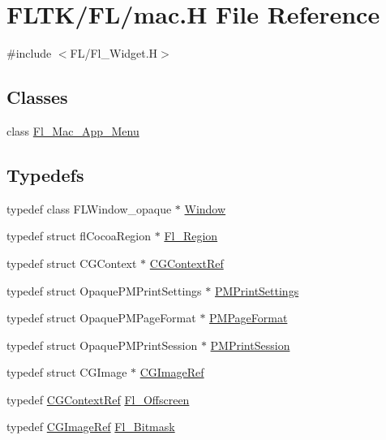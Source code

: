 \hypertarget{mac_8_h}{}\section{F\+L\+T\+K/\+F\+L/mac.H File Reference}
\label{mac_8_h}
{\ttfamily \#include $<$F\+L/\+Fl\+\_\+\+Widget.\+H$>$}\newline
\subsection*{Classes}
\begin{DoxyCompactItemize}
\item 
class \hyperlink{class_fl___mac___app___menu}{Fl\+\_\+\+Mac\+\_\+\+App\+\_\+\+Menu}
\end{DoxyCompactItemize}
\subsection*{Typedefs}
\begin{DoxyCompactItemize}
\item 
typedef class F\+L\+Window\+\_\+opaque $\ast$ \hyperlink{mac_8_h_a213656d363e884b651cc92f58e863fc6}{Window}
\item 
typedef struct fl\+Cocoa\+Region $\ast$ \hyperlink{mac_8_h_ac80c9f95cc93c989c5a953a749f45cb6}{Fl\+\_\+\+Region}
\item 
typedef struct C\+G\+Context $\ast$ \hyperlink{mac_8_h_aa24159a5753580ec784c2fd390213c7f}{C\+G\+Context\+Ref}
\item 
typedef struct Opaque\+P\+M\+Print\+Settings $\ast$ \hyperlink{mac_8_h_ae884d71f2d3fc33a29e1720245fb9de5}{P\+M\+Print\+Settings}
\item 
typedef struct Opaque\+P\+M\+Page\+Format $\ast$ \hyperlink{mac_8_h_afda4f1155b3e6fd1f500313ed4376138}{P\+M\+Page\+Format}
\item 
typedef struct Opaque\+P\+M\+Print\+Session $\ast$ \hyperlink{mac_8_h_ac2b872188288fc60768520efc0ddf821}{P\+M\+Print\+Session}
\item 
typedef struct C\+G\+Image $\ast$ \hyperlink{mac_8_h_a75461eac74c23c49c936eb8811388b88}{C\+G\+Image\+Ref}
\item 
typedef \hyperlink{mac_8_h_aa24159a5753580ec784c2fd390213c7f}{C\+G\+Context\+Ref} \hyperlink{mac_8_h_ad24d9679e17ea5ffa910ed355d4df340}{Fl\+\_\+\+Offscreen}
\item 
typedef \hyperlink{mac_8_h_a75461eac74c23c49c936eb8811388b88}{C\+G\+Image\+Ref} \hyperlink{mac_8_h_a90133b6f8cfb11ab81d83b2c4d91310d}{Fl\+\_\+\+Bitmask}
\end{DoxyCompactItemize}
